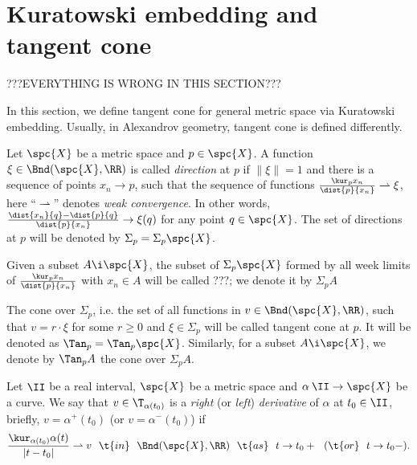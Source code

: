 {%

















\section{Kuratowski embedding and tangent cone}

???EVERYTHING IS WRONG IN THIS SECTION???

In this section, we define tangent cone for general metric space via Kuratowski embedding.
Usually, in Alexandrov geometry, tangent cone is defined differently.

Let $\spc{X}$ be a metric space and $p\in\spc{X}$.
A function $\xi\in\Bnd(\spc{X},\RR)$ is called \emph{direction} at $p$ if $\|\xi\|=1$ and there is a sequence of points $x_n\to p$, such that the sequence of functions $\frac{\kur_p x_n}{\dist{p}{x_n}}\rightharpoonup\xi$,
here ``$\rightharpoonup$''\index{$\rightharpoonup$} denotes \emph{weak convergence}.
In other words, $\frac{\dist{x_n}{q}-\dist{p}{q}}{\dist{p}{x_n}}\to \xi(q)$ for any point $q\in \spc{X}$.
The set of directions at $p$ will be denoted by $\Sigma_p=\Sigma_p\spc{X}$.


Given a subset $A\i \spc{X}$, the subset of $\Sigma_p\spc{X}$ formed by all week limits of $\frac{\kur_p x_n}{\dist{p}{x_n}}$ with $x_n\in A$
will be called ???; we denote it by $\Sigma_p A$ 

The cone over  $\Sigma_p$,
i.e. the set of all functions in $v\in\Bnd(\spc{X},\RR)$, such that 
$v=r\cdot\xi$ for some $r\ge 0$ and $\xi\in\Sigma_p$ will be called tangent cone at $p$.
It will be denoted as $\Tan_p=\Tan_p\spc{X}$.
Similarly, for a subset $A\i\spc{X}$, we denote by $\Tan_p A$ the cone over $\Sigma_p A$.








Let $\II$ be a real interval,
$\spc{X}$ be a metric space 
and $\alpha\:\II\to \spc{X}$ be a curve.
We say that $v\in\T_{\alpha(t_0)}$ is a \emph{right} (or \emph{left}) \emph{derivative} of $\alpha$ at $t_0\in\II$, briefly, $v=\alpha^+(t_0)$ (or $v=\alpha^-(t_0)$)
if 
$$\frac{\kur_{\alpha(t_0)}{\alpha(t)}}{|t-t_0|}\rightharpoonup v\ \ \t{in}\ \ \Bnd(\spc{X},\RR)\ \ \t{as}\ \ t\to t_0+\ \ (\t{or}\ \ t\to t_0-).$$


}
